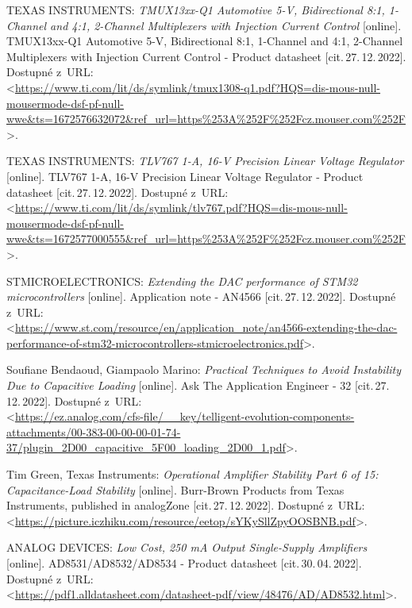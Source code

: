 \begin{thebibliography}{99}
    TEXAS INSTRUMENTS:
    \emph{TMUX13xx-Q1 Automotive 5-V, Bidirectional 8:1, 1-Channel and 4:1, 2-Channel
    Multiplexers with Injection Current Control}\/ [online].
    TMUX13xx-Q1 Automotive 5-V, Bidirectional 8:1, 1-Channel and 4:1, 2-Channel
    Multiplexers with Injection Current Control - Product datasheet [cit.\,27.\,12.\,2022].
    Dostupné z~URL:\\
    <\url{https://www.ti.com/lit/ds/symlink/tmux1308-q1.pdf?HQS=dis-mous-null-mousermode-dsf-pf-null-wwe&ts=1672576632072&ref_url=https%253A%252F%252Fcz.mouser.com%252F}>.

    TEXAS INSTRUMENTS:
    \emph{TLV767 1-A, 16-V Precision Linear Voltage Regulator}\/ [online].
    TLV767 1-A, 16-V Precision Linear Voltage Regulator - Product datasheet [cit.\,27.\,12.\,2022].
    Dostupné z~URL:\\
    <\url{https://www.ti.com/lit/ds/symlink/tlv767.pdf?HQS=dis-mous-null-mousermode-dsf-pf-null-wwe&ts=1672577000555&ref_url=https%253A%252F%252Fcz.mouser.com%252F}>.

    STMICROELECTRONICS:
    \emph{Extending the DAC performance of STM32 microcontrollers}\/ [online].
    Application note - AN4566 [cit.\,27.\,12.\,2022].
    Dostupné z~URL:\\
    <\url{https://www.st.com/resource/en/application_note/an4566-extending-the-dac-performance-of-stm32-microcontrollers-stmicroelectronics.pdf}>.

    Soufiane Bendaoud, Giampaolo Marino:
    \emph{Practical Techniques to Avoid Instability Due to Capacitive Loading}\/ [online].
    Ask The Application Engineer - 32 [cit.\,27.\,12.\,2022].
    Dostupné z~URL:\\
    <\url{https://ez.analog.com/cfs-file/__key/telligent-evolution-components-attachments/00-383-00-00-00-01-74-37/plugin_2D00_capacitive_5F00_loading_2D00_1.pdf}>.

    Tim Green, Texas Instruments:
    \emph{Operational Amplifier Stability Part 6 of 15: Capacitance-Load Stability}\/ [online].
    Burr-Brown Products from Texas Instruments, published in analogZone [cit.\,27.\,12.\,2022].
    Dostupné z~URL:\\
    <\url{https://picture.iczhiku.com/resource/eetop/sYKySllZpyOOSBNB.pdf}>.

    ANALOG DEVICES:
    \emph{Low Cost, 250 mA Output Single-Supply Amplifiers}\/ [online].
    AD8531/AD8532/AD8534 - Product datasheet [cit.\,30.\,04.\,2022].
    Dostupné z~URL:\\
    <\url{https://pdf1.alldatasheet.com/datasheet-pdf/view/48476/AD/AD8532.html}>.

\end{thebibliography}



